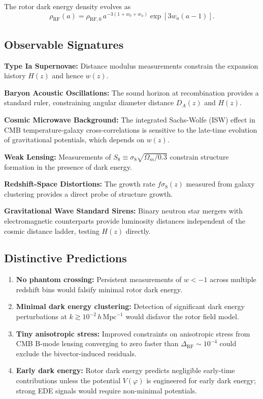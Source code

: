 \documentclass[11pt,a4paper]{article}
\numberwithin{equation}{section}
\theoremstyle{plain}
\theoremstyle{definition}
\theoremstyle{remark}
\begin{document}
The rotor dark energy density evolves as
\begin{equation}
\rho_{\mathrm{RF}}(a) = \rho_{\mathrm{RF},0}\, a^{-3(1+w_0+w_a)}\exp\left[3w_a(a-1)\right].
\label{eq:rho-evolution}
\end{equation}

\subsection{Observable Signatures}

\textbf{Type Ia Supernovae:} Distance modulus measurements constrain the expansion history $H(z)$ and hence $w(z)$.

\textbf{Baryon Acoustic Oscillations:} The sound horizon at recombination provides a standard ruler, constraining angular diameter distance $D_A(z)$ and $H(z)$.

\textbf{Cosmic Microwave Background:} The integrated Sachs-Wolfe (ISW) effect in CMB temperature-galaxy cross-correlations is sensitive to the late-time evolution of gravitational potentials, which depends on $w(z)$.

\textbf{Weak Lensing:} Measurements of $S_8 \equiv \sigma_8\sqrt{\Omega_m/0.3}$ constrain structure formation in the presence of dark energy.

\textbf{Redshift-Space Distortions:} The growth rate $f\sigma_8(z)$ measured from galaxy clustering provides a direct probe of structure growth.

\textbf{Gravitational Wave Standard Sirens:} Binary neutron star mergers with electromagnetic counterparts provide luminosity distances independent of the cosmic distance ladder, testing $H(z)$ directly.

\subsection{Distinctive Predictions}

\begin{enumerate}
  \item \textbf{No phantom crossing:} Persistent measurements of $w < -1$ across multiple redshift bins would falsify minimal rotor dark energy.
  \item \textbf{Minimal dark energy clustering:} Detection of significant dark energy perturbations at $k \gtrsim 10^{-2}\,h\,\mathrm{Mpc}^{-1}$ would disfavor the rotor field model.
  \item \textbf{Tiny anisotropic stress:} Improved constraints on anisotropic stress from CMB B-mode lensing converging to zero faster than $\Delta_{\mathrm{RF}} \sim 10^{-4}$ could exclude the bivector-induced residuals.
  \item \textbf{Early dark energy:} Rotor dark energy predicts negligible early-time contributions unless the potential $V(\varphi)$ is engineered for early dark energy; strong EDE signals would require non-minimal potentials.
\end{enumerate}
\end{document}
